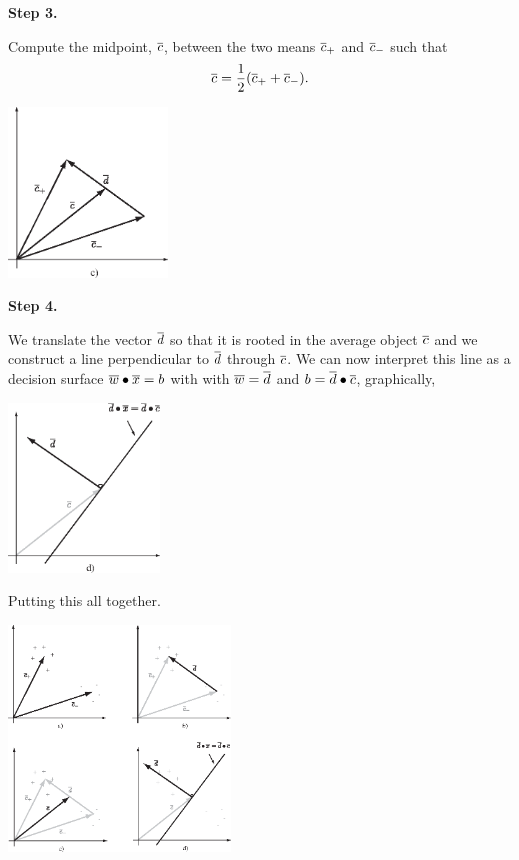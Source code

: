 \documentclass[a4paper,blends,pdf,colorBG,slideColor]{prosper}
\begin{document}

{\bf Step 3.}

Compute the midpoint, $\overline{c}$, between the two means 
$\overline{c}_+$ and $\overline{c}_-$ such that
\[
\overline{c} = \frac{1}{2}(\overline{c}_+ + \overline{c}_-).
\]

\vspace{.2in}

\begin{center}
\includegraphics[height=45mm]{figures/simple-c.eps}
\end{center}
\es


{\bf Step 4.}

We translate the vector $\overline{d}$ so that it is rooted in the average object $\overline{c}$ and we construct
a line perpendicular to $\overline{d}$ through $\overline{c}$.
We can now interpret this line as a decision surface $\overline{w}\bullet\overline{x} = b$ with
with 
$\overline{w} = \overline{d}$ and
$b = \overline{d}\bullet\overline{c}$, graphically,

\vspace{.2in}
\begin{center}
\includegraphics[height=45mm]{figures/simple-d.eps}
\end{center}
\es

Putting this all together.
\vspace{.2in}
\begin{center}
\includegraphics[height=60mm]{figures/fig04-03.eps}
\end{center}
\es
\end{document}
